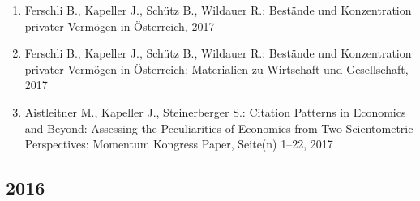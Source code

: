 \begin{enumerate}
	 \item Ferschli B., Kapeller J., Schütz B., Wildauer R.: Bestände und Konzentration privater Vermögen in Österreich, 2017
	 \item Ferschli B., Kapeller J., Schütz B., Wildauer R.: Bestände und Konzentration privater Vermögen in Österreich: Materialien zu Wirtschaft und Gesellschaft, 2017
	 \item Aistleitner M., Kapeller J., Steinerberger S.: Citation Patterns in Economics and Beyond: Assessing the Peculiarities of Economics from Two Scientometric Perspectives: Momentum Kongress Paper, Seite(n) 1--22, 2017
\end{enumerate}
\subsection*{2016}
